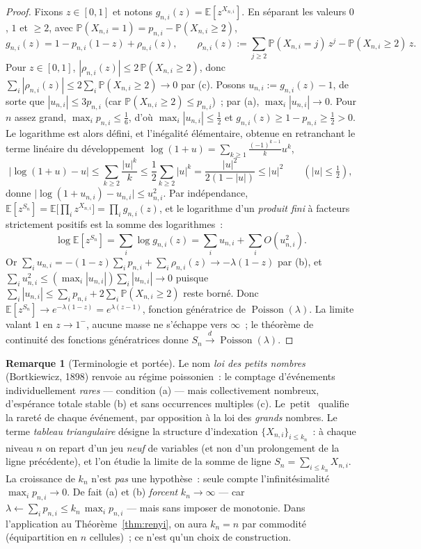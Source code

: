 \documentclass[11pt,a4paper]{article}
\providecommand{\og}{\guillemotleft\,}\providecommand{\fg}{\,\guillemotright}
\theoremstyle{plain}
\theoremstyle{definition}
\newtheorem{remarque}[theoreme]{Remarque}
\newcommand{\E}{\mathbb{E}}
\newcommand{\PP}{\mathbb{P}}
\newcommand{\Poi}{\operatorname{Poisson}}
\begin{document}
\begin{proof}
Fixons $z\in[0,1]$ et notons $g_{n,i}(z)=\E[z^{X_{n,i}}]$. En séparant les valeurs $0$, $1$ et $\ge2$, avec $\PP(X_{n,i}=1)=p_{n,i}-\PP(X_{n,i}\ge2)$,
\[
g_{n,i}(z)=1-p_{n,i}(1-z)+\rho_{n,i}(z),
\qquad
\rho_{n,i}(z):=\sum_{j\ge2}\PP(X_{n,i}=j)\,z^{j}-\PP(X_{n,i}\ge2)\,z .
\]
Pour $z\in[0,1]$, $|\rho_{n,i}(z)|\le 2\,\PP(X_{n,i}\ge2)$, donc $\sum_i|\rho_{n,i}(z)|\le 2\sum_i\PP(X_{n,i}\ge2)\to0$ par (c). Posons $u_{n,i}:=g_{n,i}(z)-1$, de sorte que $|u_{n,i}|\le 3p_{n,i}$ (car $\PP(X_{n,i}\ge2)\le p_{n,i}$)~; par (a), $\max_i|u_{n,i}|\to0$. Pour $n$ assez grand, $\max_i p_{n,i}\le\tfrac16$, d'où $\max_i|u_{n,i}|\le\tfrac12$ et $g_{n,i}(z)\ge 1-p_{n,i}\ge\tfrac12>0$. Le logarithme est alors défini, et l'inégalité élémentaire, obtenue en retranchant le terme linéaire du développement $\log(1+u)=\sum_{k\ge1}\frac{(-1)^{k-1}}{k}u^k$,
\[
\big|\log(1+u)-u\big|\le\sum_{k\ge2}\frac{|u|^k}{k}\le\frac12\sum_{k\ge2}|u|^k=\frac{|u|^2}{2(1-|u|)}\le |u|^2\qquad(|u|\le\tfrac12),
\]
donne $\big|\log(1+u_{n,i})-u_{n,i}\big|\le u_{n,i}^2$. Par indépendance, $\E[z^{S_n}]=\E\big[\prod_i z^{X_{n,i}}\big]=\prod_i g_{n,i}(z)$, et le logarithme d'un \emph{produit fini} à facteurs strictement positifs est la somme des logarithmes~:
\[
\log\E[z^{S_n}]=\sum_i\log g_{n,i}(z)=\sum_i u_{n,i}+\sum_i O(u_{n,i}^2).
\]
Or $\sum_i u_{n,i}=-(1-z)\sum_i p_{n,i}+\sum_i\rho_{n,i}(z)\to-\lambda(1-z)$ par (b), et $\sum_i u_{n,i}^2\le(\max_i|u_{n,i}|)\sum_i|u_{n,i}|\to0$ puisque $\sum_i|u_{n,i}|\le\sum_i p_{n,i}+2\sum_i\PP(X_{n,i}\ge2)$ reste borné. Donc $\E[z^{S_n}]\to e^{-\lambda(1-z)}=e^{\lambda(z-1)}$, fonction génératrice de $\Poi(\lambda)$. La limite valant $1$ en $z\to1^-$, aucune masse ne s'échappe vers $\infty$~; le théorème de continuité des fonctions génératrices donne $S_n\xrightarrow{d}\Poi(\lambda)$.
\end{proof}

\begin{remarque}[Terminologie et portée]\label{rem:petits-nombres}
Le nom \emph{loi des petits nombres} (Bortkiewicz, 1898) renvoie au régime poissonien~: le comptage d'événements individuellement \emph{rares} --- condition (a) --- mais collectivement nombreux, d'espérance totale stable (b) et sans occurrences multiples (c). Le \og petit \fg{} qualifie la rareté de chaque événement, par opposition à la loi des \emph{grands} nombres. Le terme \emph{tableau triangulaire} désigne la structure d'indexation $\{X_{n,i}\}_{i\le k_n}$~: à chaque niveau $n$ on repart d'un jeu \emph{neuf} de variables (et non d'un prolongement de la ligne précédente), et l'on étudie la limite de la somme de ligne $S_n=\sum_{i\le k_n}X_{n,i}$. La croissance de $k_n$ n'est \emph{pas} une hypothèse~: seule compte l'infinitésimalité $\max_i p_{n,i}\to0$. De fait (a) et (b) \emph{forcent} $k_n\to\infty$ --- car $\lambda\leftarrow\sum_i p_{n,i}\le k_n\,\max_i p_{n,i}$ --- mais sans imposer de monotonie. Dans l'application au Théorème~\ref{thm:renyi}, on aura $k_n=n$ par commodité (équipartition en $n$ cellules)~; ce n'est qu'un choix de construction.
\end{remarque}
\end{document}
